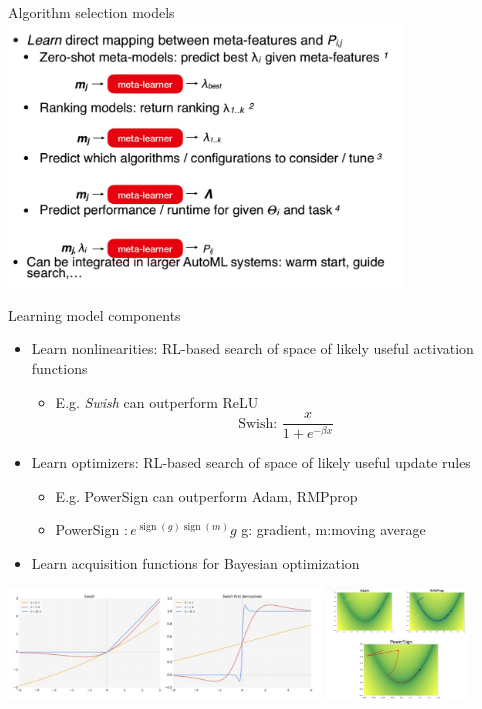 \begin{frame}{Algorithm selection models}
    \centering\includegraphics[height=7cm]{image/img233552.jpg}
\end{frame}

\begin{frame}{Learning model components}
    \begin{itemize}
        \item Learn nonlinearities: RL-based search of space of likely useful activation functions 
        \begin{itemize}
            \item E.g. \textit{Swish} can outperform ReLU
            $$  \text { Swish: } \frac{x}{1+e^{-\beta x}}$$
        \end{itemize}
        \item Learn optimizers: RL-based search of space of likely useful update rules 
        \begin{itemize}
            \item E.g. PowerSign can outperform Adam, RMPprop
            \item PowerSign $: e^{\operatorname{sign}(g) \operatorname{sign}(m)} g$
g: gradient, m:moving average
        \end{itemize}
        \item Learn acquisition functions for Bayesian optimization
    \end{itemize}
    \includegraphics[height=3cm]{image/img234610.jpg}
    \includegraphics[height=3cm]{image/img234631.jpg}
\end{frame}

